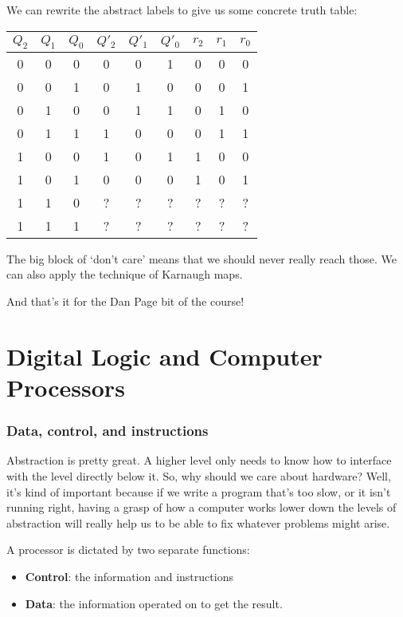 \documentclass[11pt,a4paper,titlepage,dvipsnames,cmyk]{scrartcl}
\begin{document}
We can rewrite the abstract labels to give us some concrete truth table:
\begin{center}
    \begin{tabular}{|c c c|c c c|c c c|}
        \hline
        $Q_2$ & $Q_1$ & $Q_0$ & $Q'_2$ & $Q'_1$ & $Q'_0$ & $r_2$ & $r_1$ & $r_0$ \\ \hline
        0 & 0 & 0 & 0 & 0 & 1 & 0 & 0 & 0 \\ \hline
        0 & 0 & 1 & 0 & 1 & 0 & 0 & 0 & 1 \\ \hline
        0 & 1 & 0 & 0 & 1 & 1 & 0 & 1 & 0 \\ \hline
        0 & 1 & 1 & 1 & 0 & 0 & 0 & 1 & 1 \\ \hline
        1 & 0 & 0 & 1 & 0 & 1 & 1 & 0 & 0 \\ \hline
        1 & 0 & 1 & 0 & 0 & 0 & 1 & 0 & 1 \\ \hline
        1 & 1 & 0 & ? & ? & ? & ? & ? & ? \\ \hline
        1 & 1 & 1 & ? & ? & ? & ? & ? & ? \\ \hline
    \end{tabular}
\end{center}

The big block of `don't care' means that we should never really reach
those. We can also apply the technique of Karnaugh maps.

And that's it for the Dan Page bit of the course!

\newpage
\part{Digital Logic and Computer Processors}
\label{part2}

\section{Data, control, and instructions}%
\label{sec:Data}

Abstraction is pretty great. A higher level only needs to know how to
interface with the level directly below it. So, why should we care about
hardware? Well, it's kind of important because if we write a program
that's too slow, or it isn't running right, having a grasp of how a
computer works lower down the levels of abstraction will really help us
to be able to fix whatever problems might arise.

A processor is dictated by two separate functions:
\begin{itemize}
    \item \textbf{Control}: the information and instructions
    \item \textbf{Data}: the information operated on to get the result.
\end{itemize}
\end{document}
